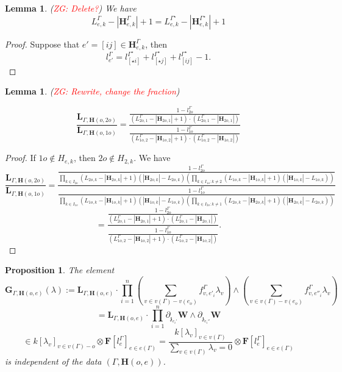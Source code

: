 \documentclass[11pt]{amsart}
\newtheorem{lem}[thm]{Lemma}
\newtheorem{prop}[thm]{Proposition}
\theoremstyle{definition}
\theoremstyle{remark}
\numberwithin{equation}{section}
\newcommand{\Gui}[1]{(\textcolor{red}{ZG: #1})}
\begin{document}
\begin{lem}\label{lVariableInv}
\Gui{Delete?}
  We have
  $$
  L^{\Gamma}_{e,k}-|\mathbf{H}^{\Gamma}_{e,k}|+1=L^{\Gamma^{\star}}_{e,k}-|\mathbf{H}^{\Gamma^{\star}}_{e,k}|+1
  $$
\end{lem}
\begin{proof}
  Suppose that $e'=[ij]\in \mathbf{H}^{\Gamma}_{e,k}$, then
  $$
  l^{\Gamma}_{e'}=l^{\Gamma^{\star}}_{[\star i]}+l^{\Gamma^{\star}}_{[\star j]}+l^{\Gamma^{\star}}_{[ij]}-1.
  $$
\end{proof}
\begin{lem}
\Gui{Rewrite, change the fraction}

  $$
  \frac{\mathbf{L}_{\Gamma,\mathbf{H}(o,2o)}}{\mathbf{L}_{\Gamma,\mathbf{H}(o,1o)}}=\frac{\frac{1-l^{\Gamma}_{2o}}{(L^{\Gamma}_{2o,1}-|\mathbf{H}_{2o,1}|+1)\cdot(L^{\Gamma}_{2o,1}-|\mathbf{H}_{2o,1}|) } }{\frac{1-l^{\Gamma}_{1o}}{(L^{\Gamma}_{1o,2}-|\mathbf{H}_{1o,2}|+1)\cdot(L^{\Gamma}_{1o,2}-|\mathbf{H}_{1o,2}|)} }
  $$

\end{lem}
\begin{proof}
  If $1o\notin H_{e,k}$, then $2o\notin H_{2,k}$. We have
  $$
  \frac{\mathbf{L}_{\Gamma,\mathbf{H}(o,2o)}}{\mathbf{L}_{\Gamma,\mathbf{H}(o,1o)}}=\frac{\frac{1-l_{2o}^{\Gamma}}{\prod\limits_{k\in I_{2o}}(L_{2o,k}-|\mathbf{H}_{2o,k}|+1)(|\mathbf{H}_{2o,k}|-L_{2o,k})\left(\prod\limits_{k\in I_{1o}:k\neq 2}(L_{1o,k}-|\mathbf{H}_{1o,k}|+1)(|\mathbf{H}_{1o,k}|-L_{1o,k})\right)}}{\frac{1-l_{1o}^{\Gamma}}{\prod\limits_{k\in I_{1o}}(L_{1o,k}-|\mathbf{H}_{1o,k}|+1)(|\mathbf{H}_{1o,k}|-L_{1o,k})\left(\prod\limits_{k\in I_{2o}:k\neq 1}(L_{2o,k}-|\mathbf{H}_{2o,k}|+1)(|\mathbf{H}_{2o,k}|-L_{2o,k})\right)}}
  $$
  $$
  =\frac{\frac{1-l^{\Gamma}_{2o}}{(L^{\Gamma}_{2o,1}-|\mathbf{H}_{2o,1}|+1)\cdot(L^{\Gamma}_{2o,1}-|\mathbf{H}_{2o,1}|) } }{\frac{1-l^{\Gamma}_{1o}}{(L^{\Gamma}_{1o,2}-|\mathbf{H}_{1o,2}|+1)\cdot(L^{\Gamma}_{1o,2}-|\mathbf{H}_{1o,2}|)} }.
  $$

\end{proof}
\begin{prop}

  The element
  $$
  \mathbf{G}_{\Gamma,\mathbf{H}(o,e)}(\lambda):=\mathbf{L}_{\Gamma,\mathbf{H}(o,e)}\cdot\prod^n_{i=1}(\sum_{v\in v(\Gamma)-v(e_o)}f^{\Gamma}_{v,e'_i}\lambda_v)\wedge(\sum_{v\in v(\Gamma)-v(e_o)}f^{\Gamma}_{v,e''_i}\lambda_v)
  $$
  $$
  =\mathbf{L}_{\Gamma,\mathbf{H}(o,e)}\cdot\prod^n_{i=1}\partial_{\mathfrak{z}_{e_i'}}\mathbf{W}\wedge\partial_{\mathfrak{z}_{e_i''}}\mathbf{W}
  $$
  $$
  \in k[\lambda_v]_{v\in v(\Gamma)-o}\otimes \mathbf{F}[l^{\Gamma}_e]_{e\in e(\Gamma)}=\frac{k[\lambda_v]_{v\in v(\Gamma)}}{\sum\limits_{v\in v(\Gamma)}\lambda_v=0}\otimes \mathbf{F}[l^{\Gamma}_e]_{e\in e(\Gamma)}
  $$
  is independent of the data $(\Gamma,\mathbf{H}(o,e))$.
\end{prop}
\end{document}
